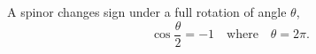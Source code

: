 \documentclass{article}
\begin{document}
A spinor changes sign under a full rotation of angle $\theta$,
\begin{equation}
\cos\frac{\theta}{2} = -1 \quad \text{where} \quad \theta = 2\pi .
\label{eq:full}
\end{equation}
\end{document}
